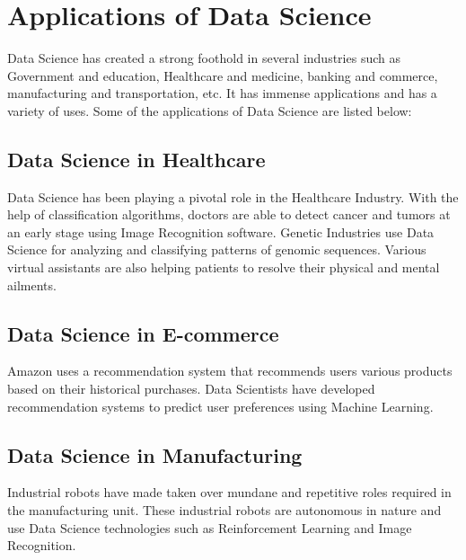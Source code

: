 \documentclass[
]{book}
\begin{document}
\hypertarget{applications-of-data-science}{%
\section{Applications of Data Science}\label{applications-of-data-science}}

Data Science has created a strong foothold in several industries such as Government and education, Healthcare and medicine, banking and commerce, manufacturing and transportation, etc. It has immense applications and has a variety of uses. Some of the applications of Data Science are listed below:

\hypertarget{data-science-in-healthcare}{%
\subsection*{Data Science in Healthcare}\label{data-science-in-healthcare}}


Data Science has been playing a pivotal role in the Healthcare Industry. With the help of classification algorithms, doctors are able to detect cancer and tumors at an early stage using Image Recognition software. Genetic Industries use Data Science for analyzing and classifying patterns of genomic sequences. Various virtual assistants are also helping patients to resolve their physical and mental ailments.

\hypertarget{data-science-in-e-commerce}{%
\subsection*{Data Science in E-commerce}\label{data-science-in-e-commerce}}


Amazon uses a recommendation system that recommends users various products based on their historical purchases. Data Scientists have developed recommendation systems to predict user preferences using Machine Learning.

\hypertarget{data-science-in-manufacturing}{%
\subsection*{Data Science in Manufacturing}\label{data-science-in-manufacturing}}


Industrial robots have made taken over mundane and repetitive roles required in the manufacturing unit. These industrial robots are autonomous in nature and use Data Science technologies such as Reinforcement Learning and Image Recognition.
\end{document}
